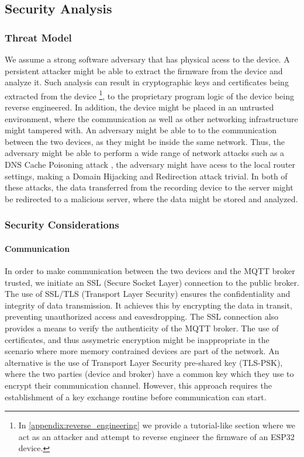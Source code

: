 \documentclass[conference]{IEEEtran}
\begin{document}
\subsection{Security Analysis}
\label{subsec:security_analysis}


\subsubsection{Threat Model}

We assume a strong software adversary that has physical acess to the device.
A persistent attacker might be able to extract the firmware from the device and
analyze it. Such analysis can result in cryptographic keys and certificates being extracted from the device
\footnote{In \cref{appendix:reverse_engineering} we provide a tutorial-like section where we act as an attacker and attempt to reverse engineer the firmware of an ESP32 device.}, 
to the proprietary program logic of the device being reverse engineered.
In addition, the device might be placed in an untrusted environment, where the communication as well 
as other networking infrastructure might tampered with.
An adversary might be able to  to the communication between the two devices,
as they might be inside the same network.
Thus, the adversary might be able to perform a wide range of network attacks such 
as a DNS Cache Poisoning attack \cite{Dissanayake_2018}, the adversary might have acess to the local router 
settings, making a Domain Hijacking and Redirection attack \cite{DnsHijacking} trivial. In both of these attacks, 
the data transferred from the recording device to the server might be redirected to a malicious server, 
where the data might be stored and analyzed.

\subsubsection{Security Considerations}

\paragraph{Communication}

In order to make communication between the two devices and the MQTT broker
trusted, we initiate an SSL (Secure Socket Layer) connection to the public broker. 
The use of SSL/TLS (Transport Layer Security)
ensures the confidentiality and integrity of data transmission. 
It achieves this by encrypting the data in transit, preventing
unauthorized access and eavesdropping. The SSL connection also provides a means
to verify the authenticity of the MQTT broker.
The use of certificates, and thus assymetric encryption might be inappropriate in the scenario where more 
memory contrained devices are part of the network. 
An alternative is the use of Transport Layer Security pre-shared key (TLS-PSK), where the two parties 
(device and broker) have a common key which they use to encrypt their communication channel.
However, this approach requires the establishment of a key exchange routine before communication can start.
\end{document}
